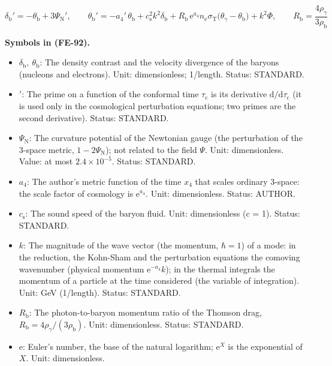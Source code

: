 \documentclass[
  10pt,
]{article}
\providecommand{\tightlist}{%
  \setlength{\itemsep}{0pt}\setlength{\parskip}{0pt}}
\begin{document}
\[
\delta_{\mathrm{b}}' = -\theta_{\mathrm{b}} + 3\Psi_{\mathrm{N}}',\qquad
\theta_{\mathrm{b}}' = -a_4'\,\theta_{\mathrm{b}} + c_{\mathrm{s}}^2k^2\delta_{\mathrm{b}}
 + R_{\mathrm{b}}\,\mathrm{e}^{a_4}n_{\mathrm{e}}\sigma_{\mathrm{T}}\big(\theta_\gamma -
 \theta_{\mathrm{b}}\big) + k^2\Phi,\qquad
R_{\mathrm{b}} = \frac{4\rho_\gamma}{3\rho_{\mathrm{b}}} \tag{FE-92}
\]

\textbf{Symbols in (FE-92).}

\begin{itemize}
\tightlist
\item
  \(\delta_{\mathrm{b}},\ \theta_{\mathrm{b}}\): The density contrast
  and the velocity divergence of the baryons (nucleons and electrons).
  Unit: dimensionless; 1/length. Status: STANDARD.
\item
  \({}'\): The prime on a function of the conformal time
  \(\tau_{\mathrm{c}}\) is its derivative
  \(\mathrm{d}/\mathrm{d}\tau_{\mathrm{c}}\) (it is used only in the
  cosmological perturbation equations; two primes are the second
  derivative). Status: STANDARD.
\item
  \(\Psi_{\mathrm{N}}\): The curvature potential of the Newtonian gauge
  (the perturbation of the 3-space metric, \(1 - 2\Psi_{\mathrm{N}}\));
  not related to the field \(\Psi\). Unit: dimensionless. Value: at most
  \(2.4\times10^{-5}\). Status: STANDARD.
\item
  \(a_4\): The author's metric function of the time \(x_4\) that scales
  ordinary 3-space: the scale factor of cosmology is
  \(\mathrm{e}^{a_4}\). Unit: dimensionless. Status: AUTHOR.
\item
  \(c_{\mathrm{s}}\): The sound speed of the baryon fluid. Unit:
  dimensionless (c = 1). Status: STANDARD.
\item
  \(k\): The magnitude of the wave vector (the momentum, \(\hbar = 1\))
  of a mode: in the reduction, the Kohn-Sham and the perturbation
  equations the comoving wavenumber (physical momentum
  \(\mathrm{e}^{-a_4}k\)); in the thermal integrals the momentum of a
  particle at the time considered (the variable of integration). Unit:
  GeV (1/length). Status: STANDARD.
\item
  \(R_{\mathrm{b}}\): The photon-to-baryon momentum ratio of the Thomson
  drag, \(R_{\mathrm{b}} = 4\rho_\gamma/(3\rho_{\mathrm{b}})\). Unit:
  dimensionless. Status: STANDARD.
\item
  \(\mathrm{e}\): Euler's number, the base of the natural logarithm;
  \(\mathrm{e}^{X}\) is the exponential of \(X\). Unit: dimensionless.

\end{itemize}
\end{document}
